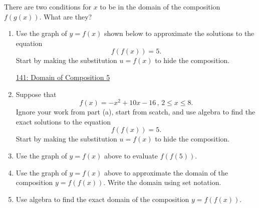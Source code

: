 \documentclass{ximera}
\begin{document}
\begin{question}   \label{Q1:Comp}
There are two conditions for $x$ to be in the domain of the composition $f(g(x))$. What are they?
\end{question}


\begin{example}  \label{Eerg4t4r5}
\begin{enumerate}

\item Use the graph of $y=f(x)$ shown below to approximate the solutions to the equation
\[
    f(f(x)) = 5 .
\]
Start by making the substitution $u=f(x)$ to hide the composition.

\begin{onlineOnly}
    \begin{center}
\end{center}
\end{onlineOnly}

\href{https://www.desmos.com/calculator/d6zcmotesc}{141: Domain of Composition 5}

\item Suppose that 
\[
       f(x) = -x^2 +10x - 16 \, , \, 2\leq x \leq 8 .
\]
Ignore your work from part (a), start from scatch, and use algebra to find the exact solutions to the equation 
\[
    f(f(x)) = 5.
\]
Start by making the substitution $u=f(x)$ to hide the composition.

\item Use the graph of $y=f(x)$ above to evaluate $f(f(5))$. 


\item Use the graph of $y=f(x)$ above to approximate the domain of the composition $y=f(f(x))$. Write the domain using set notation.

\item Use algebra to find the exact domain of the composition $y=f(f(x))$. 

\end{enumerate}
\end{example}
\end{document}
